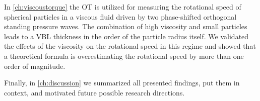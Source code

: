 In \cref{ch:viscoustorque} the OT is utilized for measuring the rotational 
speed of spherical particles in a viscous fluid driven by two phase-shifted 
orthogonal standing pressure waves. The combination of high viscosity and small 
particles leads to a VBL thickness in the order of the particle radius itself.  
We validated the effects of the viscosity on the rotational speed in this 
regime and showed that a theoretical formula is overestimating the rotational 
speed by more than one order of magnitude.

Finally, in \cref{ch:discussion} we summarized all presented findings, put them 
in context, and motivated future possible research directions.

